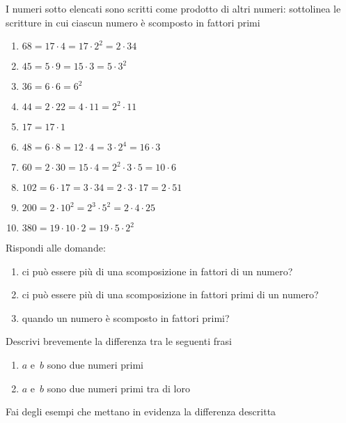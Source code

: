 \subsubsection*{}

\begin{esercizio}
I numeri sotto elencati sono scritti come prodotto di altri numeri: 
sottolinea 
le scritture in cui ciascun
numero è scomposto in fattori primi
\begin{multicols}{2}
 \begin{enumerate}[noitemsep, label=(\alph*)]
 \item \(68=17\cdot4=17\cdot2^2=2\cdot34\)
 \item \(45=5\cdot9=15\cdot3=5\cdot3^2\)
 \item \(36=6\cdot6=6^2\)
 \item \(44=2\cdot22=4\cdot11=2^2\cdot11\)
 \item \(17=17\cdot1\)
 \item \(48=6\cdot8=12\cdot4=3\cdot2^4=16\cdot3\)
 \item \(60= 2\cdot30=15\cdot4=2^2\cdot3\cdot5=10\cdot6\)
 \item \(102=6\cdot17=3\cdot34=2\cdot3\cdot17=2\cdot51\)
 \item \(200=2\cdot10^2=2^3\cdot5^2=2\cdot4\cdot25\)
 \item \(380=19\cdot10\cdot2=19\cdot5\cdot2^2\)
 \end{enumerate}
\end{multicols}
\end{esercizio}

\begin{esercizio}
 Rispondi alle domande:
 \begin{enumerate}[noitemsep, label=(\alph*)]
 \item ci può essere più di una scomposizione in fattori di un numero?
 \item ci può essere più di una scomposizione in fattori primi di un numero?
 \item quando un numero è scomposto in fattori primi?
 \end{enumerate}
\end{esercizio}

\begin{esercizio}
Descrivi brevemente la differenza tra le seguenti frasi
\begin{enumerate}[noitemsep, label=(\alph*)]
 \item \(a\) e~\(b\) sono due numeri primi
 \item \(a\) e~\(b\) sono due numeri primi tra di loro
\end{enumerate}
Fai degli esempi che mettano in evidenza la differenza descritta
\end{esercizio}


